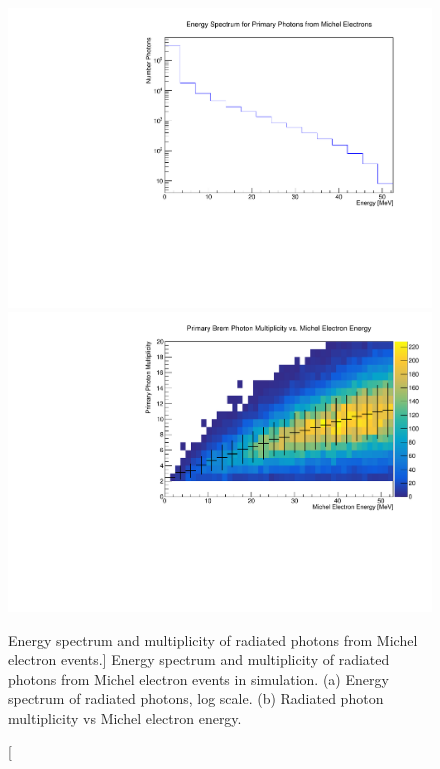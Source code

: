 \begin{figure}
	\centering
	\includegraphics[width=\textwidth]{figures/photon_spec.pdf}
	\newline
	\includegraphics[width=\textwidth]{figures/photon_mult.pdf}
	\caption
	[Energy spectrum and multiplicity of radiated photons from Michel electron 
	events.]
	{Energy spectrum  and multiplicity of radiated photons from Michel electron events in
	\protodune{} simulation. 
	(a) Energy spectrum of radiated photons, log scale. 
	(b) Radiated photon multiplicity vs Michel electron energy. 
	}
	\label{fig:photon_spec}
\end{figure}



